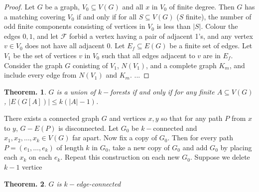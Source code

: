 \documentclass[11pt, a4paper]{memoir}
\theoremstyle{change}
\newtheorem{theorem}{Theorem.}[section]
\theoremstyle{plain}
\theoremstyle{nonumberplain}
\newtheorem{proof}{Proof}
\numberwithin{equation}{section}
\begin{document}
\begin{proof}
    Let $G$ be a graph, $V_0\subseteq V(G)$ and all $x$ in $V_0$ of finite degree.
    Then $G$ has a matching covering $V_0$ if and only if for all $S\subseteq V(G)$ ($S$ finite), the number of odd finite components consisting of vertices in $V_0$ is less than $|S|$.
    Colour the edges $0,1$, and let $\mathcal{F}$ forbid a vertex having a pair of adjacent 1's, and any vertex $v\in V_0$ does not have all adjacent $0$.
    Let $E_f\subseteq E(G)$ be a finite set of edges.
    Let $V_1$ be the set of vertices $v$ in $V_0$ such that all edges adjacent to $v$ are in $E_f$.
    Consider the graph $G$ conisting of $V_1$, $N(V_1)$, and a complete graph $K_m$, and include every edge from $N(V_1)$ and $K_m$.
    ...
\end{proof}
\begin{theorem}
    $G$ is a union of $k-$forests if and only if for any finite $A\subseteq V(G)$, $|E(G[A])|\leq k(|A|-1)$.
\end{theorem}
There exists a connected graph $G$ and vertices $x,y$ so that for any path $P$ from $x$ to $y$, $G-E(P)$ is disconnected.
Let $G_0$ be $k-$connected and $x_1,x_2,\ldots,x_k\in V(G)$ far apart.
Now fix a copy of $G_0$.
Then for every path $P=(e_1,\ldots,e_k)$ of length $k$ in $G_0$, take a new copy of $G_0$ and add $G_0$ by placing each $x_k$ on each $e_k$.
Repeat this construction on each new $G_0$.
Suppose we delete $k-1$ vertice
\begin{theorem}
    $G$ is $k-$edge-connected
\end{theorem}
\end{document}
